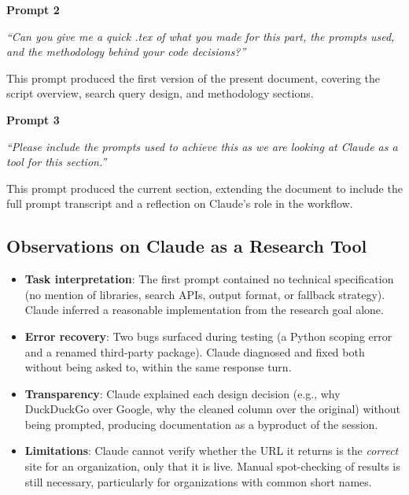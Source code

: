 \documentclass[12pt]{article}
\begin{document}
\begin{mdframed}[backgroundcolor=gray!8, linecolor=gray!40]
\textbf{Prompt 2}

\textit{``Can you give me a quick .tex of what you made for this part,
the prompts used, and the methodology behind your code decisions?''}
\end{mdframed}

\vspace{0.5em}

This prompt produced the first version of the present document, covering
the script overview, search query design, and methodology sections.

\begin{mdframed}[backgroundcolor=gray!8, linecolor=gray!40]
\textbf{Prompt 3}

\textit{``Please include the prompts used to achieve this as we are looking
at Claude as a tool for this section.''}
\end{mdframed}

\vspace{0.5em}

This prompt produced the current section, extending the document to include
the full prompt transcript and a reflection on Claude's role in the workflow.

\subsection{Observations on Claude as a Research Tool}

\begin{itemize}[leftmargin=1.5em]
  \item \textbf{Task interpretation}: The first prompt contained no technical
        specification (no mention of libraries, search APIs, output format,
        or fallback strategy). Claude inferred a reasonable implementation
        from the research goal alone.
  \item \textbf{Error recovery}: Two bugs surfaced during testing
        (a Python scoping error and a renamed third-party package). Claude
        diagnosed and fixed both without being asked to, within the same
        response turn.
  \item \textbf{Transparency}: Claude explained each design decision
        (e.g., why DuckDuckGo over Google, why the cleaned column over the
        original) without being prompted, producing documentation as a
        byproduct of the session.
  \item \textbf{Limitations}: Claude cannot verify whether the URL it
        returns is the \emph{correct} site for an organization, only that
        it is live. Manual spot-checking of results is still necessary,
        particularly for organizations with common short names.
\end{itemize}
\end{document}
